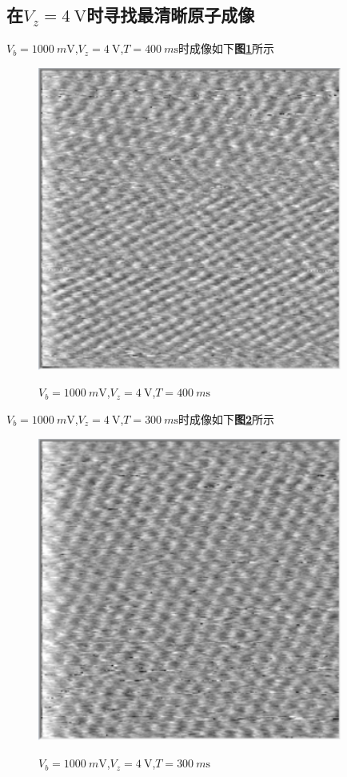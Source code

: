 \documentclass[a4paper]{article}
\begin{document}
\subsection{在$V_z=\SI{4}{\volt}$时寻找最清晰原子成像}\label{sub:2}
$V_b=\SI{1000}{m\volt}$,$V_z=\SI{4}{\volt}$,$T=\SI{400}{m\s}$时成像如下\textbf{图\ref{result:fig4}}所示
\begin{figure}[H]
 \centering
 \caption{$V_b=\SI{1000}{m\volt}$,$V_z=\SI{4}{\volt}$,$T=\SI{400}{m\s}$}
 \includegraphics[height=10cm, width=10cm]{images/4v-1000mv-400ms.png}
 \label{result:fig4}
\end{figure}
$V_b=\SI{1000}{m\volt}$,$V_z=\SI{4}{\volt}$,$T=\SI{300}{m\s}$时成像如下\textbf{图\ref{result:fig5}}所示
\begin{figure}[H]
 \centering
 \caption{$V_b=\SI{1000}{m\volt}$,$V_z=\SI{4}{\volt}$,$T=\SI{300}{m\s}$}
 \includegraphics[height=10cm, width=10cm]{images/4V-1000mV-300ms.png}
 \label{result:fig5}
\end{figure}
\end{document}
